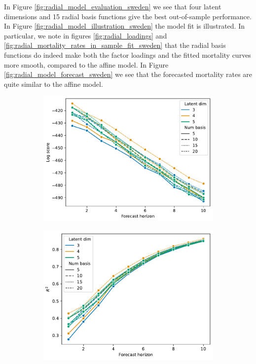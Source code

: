 \documentclass[11pt]{article}
\begin{document}
In Figure \ref{fig:radial_model_evaluation_sweden} we see that four latent dimensions and 15 radial basis functions give the best out-of-sample performance. In Figure \ref{fig:radial_model_illustration_sweden} the model fit is illustrated. In particular, we note in figures \ref{fig:radial_loadings} and \ref{fig:radial_mortality_rates_in_sample_fit_sweden} that the radial basis functions do indeed make both the factor loadings and the fitted mortality curves more smooth, compared to the affine model. In Figure \ref{fig:radial_model_forecast_sweden} we see that the forecasted mortality rates are quite similar to the affine model.
\begin{figure}
    \centering
    \begin{subfigure}[t]{0.49\textwidth}
        \centering
        \includegraphics[width=\textwidth]{figs/latent_dim_comparison_radial.pdf}
        \caption{}
    \end{subfigure}
    \hfill
    \begin{subfigure}[t]{0.49\textwidth}
        \centering
        \includegraphics[width=\textwidth]{figs/latent_dim_comparison_R2_radial.pdf}

\end{subfigure}
\end{figure}
\end{document}
